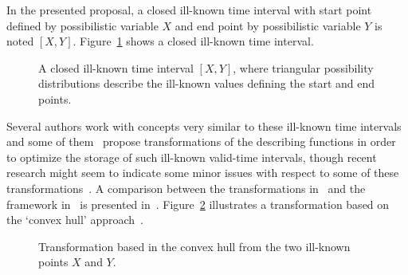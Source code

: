 In the presented proposal, a closed ill-known time interval with start point defined by possibilistic variable $X$ and end point by possibilistic variable $Y$ is noted $\left[X, Y\right]$. Figure~\ref{fig:interval} shows a closed ill-known time interval. %


\begin{figure}
\centering

\caption{A closed ill-known time interval $\left[X, Y\right]$, where triangular possibility distributions describe the ill-known values defining the start and end points.}
\label{fig:interval}
\end{figure}


Several authors work with concepts very similar to these ill-known time intervals and some of them~\cite{garrido2009} propose transformations of the describing functions in order to optimize the storage of such ill-known valid-time intervals, though recent research might seem to indicate some minor issues with respect to some of these transformations~\cite{Pon11}. A comparison between the transformations in~\cite{garrido2009} and the framework in~\cite{Pon11} is presented in~\cite{pon12}. Figure~\ref{fig:convexhull} illustrates a transformation based on the `convex hull' approach~\cite{garrido2009}.



\begin{figure}
\centering

\caption{Transformation based in the convex hull from the two ill-known points $X$ and $Y$. }
\label{fig:convexhull}
\end{figure}

